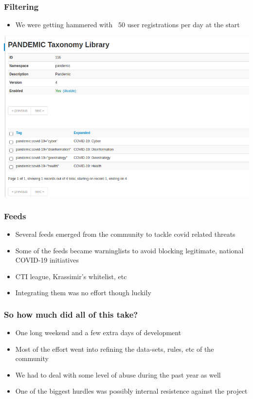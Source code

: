 \begin{frame}
    \frametitle{Filtering}
    \begin{itemize}
         \item We were getting hammered with ~50 user registrations per day at the start
    \end{itemize}
    \includegraphics[width=0.80\linewidth]{taxonomy.png}
\end{frame}

\begin{frame}
    \frametitle{Feeds}
 \begin{itemize}
         \item Several feeds emerged from the community to tackle covid related threats
         \item Some of the feeds became warninglists to avoid blocking legitimate, national COVID-19 initiatives
         \item CTI league, Krassimir's whitelist, etc
         \item Integrating them was no effort though luckily
 \end{itemize}
\end{frame}

\begin{frame}
    \frametitle{So how much did all of this take?}
 \begin{itemize}
         \item One long weekend and a few extra days of development
         \item Most of the effort went into refining the data-sets, rules, etc of the community
         \item We had to deal with some level of abuse during the past year as well
         \item One of the biggest hurdles was possibly internal resistence against the project
 \end{itemize}
\end{frame}


